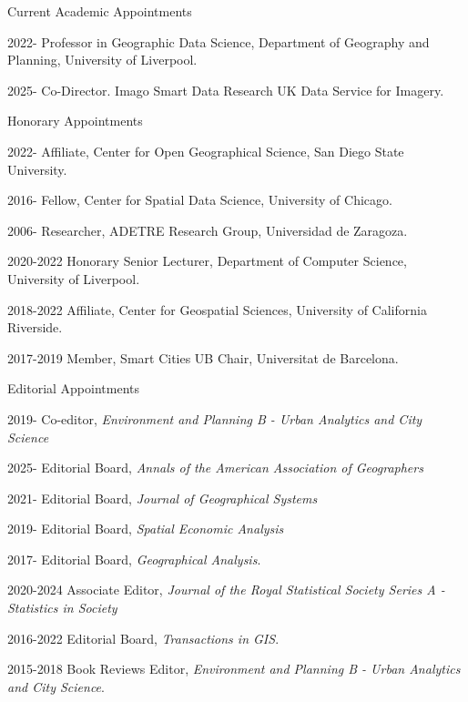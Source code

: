 \documentclass[12pt,2up]{article}
\begin{document}
\begin{cv}{}

   \begin{cvlist}{Current Academic Appointments}

 \item[2022-] Professor in Geographic Data Science, Department of Geography and
     Planning, University of Liverpool.
 \item[2025-] Co-Director. Imago Smart Data Research UK Data Service for
         Imagery.

  \end{cvlist}

   \begin{cvlist}{Honorary Appointments}

 \item[2022-] Affiliate, Center for Open Geographical Science, San Diego State
         University.

 \item[2016-] Fellow, Center for Spatial Data Science, University of Chicago.

 \item[2006-] Researcher, ADETRE Research Group, Universidad de Zaragoza.

 \item[2020-2022] Honorary Senior Lecturer, Department of Computer Science,
     University of Liverpool.

 \item[2018-2022] Affiliate, Center for Geospatial Sciences, University of
     California Riverside.

 \item[2017-2019] Member, Smart Cities UB Chair, Universitat de Barcelona.

  \end{cvlist}


   \begin{cvlist}{Editorial Appointments}
   \item[2019-] Co-editor, \textit{Environment and Planning B -
       Urban Analytics and City Science}
   \item[2025-] Editorial Board, \textit{Annals of the American Association of
           Geographers}
   \item[2021-] Editorial Board, \textit{Journal of Geographical Systems}
   \item[2019-] Editorial Board, \textit{Spatial Economic
       Analysis}
   \item[2017-] Editorial Board, \textit{Geographical Analysis}.
   \item[2020-2024] Associate Editor, \textit{Journal of the Royal Statistical Society
       Series A - Statistics in Society}
   \item[2016-2022] Editorial Board, \textit{Transactions in GIS}.
   \item[2015-2018] Book Reviews Editor, \textit{Environment and Planning B -
       Urban Analytics and City Science}.
  \end{cvlist}


\end{cv}
\end{document}
